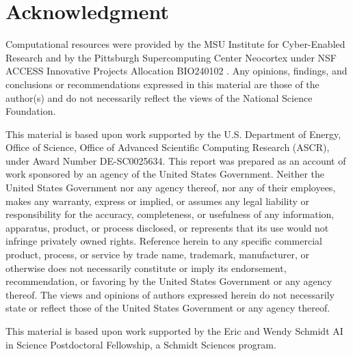 \section*{Acknowledgment}
\begin{footnotesize}
Computational resources were provided by the MSU Institute for Cyber-Enabled Research and by the Pittsburgh Supercomputing Center Neocortex under NSF ACCESS Innovative Projects Allocation BIO240102 \citep{buitrago2021neocortex,boerner2023pearc}.
Any opinions, findings, and conclusions or recommendations expressed in this material are those of the author(s) and do not necessarily reflect the views of the National Science Foundation.

This material is based upon work supported by the U.S. Department of Energy, Office of Science, Office of Advanced Scientific Computing Research (ASCR), under Award Number DE-SC0025634.
This report was prepared as an account of work sponsored by an agency of the United States Government.
Neither the United States Government nor any agency thereof, nor any of their employees, makes any warranty, express or implied, or assumes any legal liability or responsibility for the accuracy, completeness, or usefulness of any information, apparatus, product, or process disclosed, or represents that its use would not infringe privately owned rights.
Reference herein to any specific commercial product, process, or service by trade name, trademark, manufacturer, or otherwise does not necessarily constitute or imply its endorsement, recommendation, or favoring by the United States Government or any agency thereof.
The views and opinions of authors expressed herein do not necessarily state or reflect those of the United States Government or any agency thereof.

This material is based upon work supported by the Eric and Wendy Schmidt AI in Science Postdoctoral Fellowship, a Schmidt Sciences program.
\end{footnotesize}
